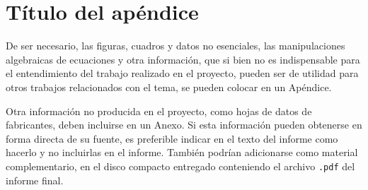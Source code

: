 
\chapter{Título del apéndice} \label{apex}
De ser necesario, las figuras, cuadros y datos no esenciales, las manipulaciones algebraicas de ecuaciones y otra información, que si bien no es indispensable para el entendimiento del trabajo realizado en el proyecto, pueden ser de utilidad para otros trabajos relacionados con el tema, se pueden colocar en un Apéndice.

Otra información no producida en el proyecto, como hojas de datos de fabricantes, deben incluirse en un Anexo.  Si esta información pueden obtenerse en forma directa de su fuente, es preferible indicar en el texto del informe como hacerlo y no incluirlas en el informe.  También podrían adicionarse como material complementario, en el disco compacto entregado conteniendo el archivo \texttt{.pdf} del informe final.
